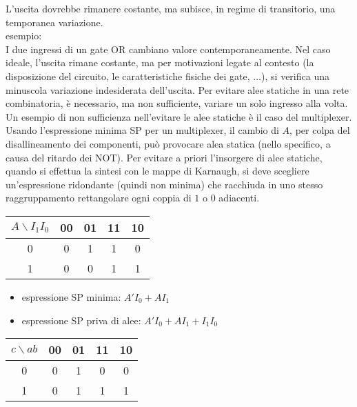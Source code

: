 \documentclass{article}
\begin{document}
L'uscita dovrebbe rimanere costante, ma subisce, in regime di transitorio, una temporanea variazione.\\

\noindent
esempio:\\

\noindent
I due ingressi di un gate OR cambiano valore contemporaneamente.
Nel caso ideale, l'uscita rimane costante, ma per motivazioni legate al contesto (la disposizione del circuito, le caratteristiche fisiche dei gate, $\dots$), si verifica una minuscola variazione indesiderata dell'uscita.
Per evitare alee statiche in una rete combinatoria, è necessario, ma non sufficiente, variare un solo ingresso alla volta.
Un esempio di non sufficienza nell'evitare le alee statiche è il caso del multiplexer.
Usando l'espressione minima SP per un multiplexer, il cambio di $A$, per colpa del disallineamento dei componenti, può provocare alea statica (nello specifico, a causa del ritardo dei NOT).
Per evitare a priori l'insorgere di alee statiche, quando si effettua la sintesi con le mappe di Karnaugh, si deve scegliere un'espressione ridondante (quindi non minima) che racchiuda in uno stesso raggruppamento rettangolare ogni coppia di $1$ o $0$ adiacenti.\\

\begin{center}
\begin{tabular}{ |c|c|c|c|c| }
\hline
$A \backslash I_1I_0$ & 00 & 01 & 11 & 10 \\
\hline
\hline
0 & 0 & 1 & 1 & 0 \\
1 & 0 & 0 & 1 & 1 \\
\hline
\end{tabular}
\end{center}

\begin{itemize}
    \item espressione SP minima: $A'I_0 + AI_1$
    \item espressione SP priva di alee: $A'I_0 + AI_1 + I_1I_0$
\end{itemize}

\begin{center}
\begin{tabular}{ |c|c|c|c|c| }
\hline
$c \backslash ab$ & 00 & 01 & 11 & 10 \\
\hline
\hline
0 & 0 & 1 & 0 & 0 \\
1 & 0 & 1 & 1 & 1 \\
\hline
\end{tabular}
\end{center}
\end{document}
